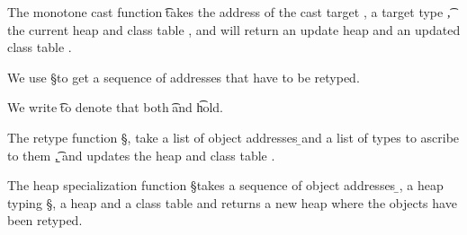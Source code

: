 \documentclass[a4paper,USenglish]{tex/lipics-v2016}
\begin{document}
The monotone cast function \moncast\a\t\s\K\Kp\sp takes the address of the
cast target \a, a target type \t, the current heap \s and class table \K, and
will return an update heap \sp and an updated class table \Kp.

We use \Dom\S to get a sequence of addresses that have to be retyped.

\begin{mathpar}
\end{mathpar}


We write \t\EQ\tp to denote that both \StrSub{}\K\t\tp and
\StrSub{}\K\tp\t hold.

The retype function \retype{\b\a}{\b\t}\S\s\K, take a list of object
addresses \b\a and a list of types to ascribe to them \b\t, and updates the
heap \s and class table \K.


\begin{mathpar}


\end{mathpar}

The heap specialization function \spec{\b\a}\S\s\K takes a
sequence of object addresses \b\a, a heap typing \S, a heap \s
and a class table \K and returns a new heap where the objects
have been retyped.
\end{document}
